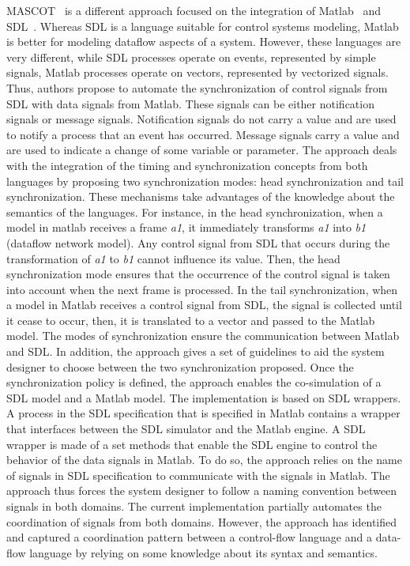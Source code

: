 MASCOT~\cite{mascotbib} is a different approach focused on the integration of Matlab~\cite{matlabbib} and SDL~\cite{sdlbib}. Whereas SDL is a language suitable for control systems modeling, Matlab is better for modeling dataflow aspects of a system. However, these languages are very different, while SDL processes operate on events, represented by simple signals, Matlab processes operate on vectors, represented by vectorized signals. Thus, authors propose to automate the synchronization of control signals from SDL with data signals from Matlab. These signals can be either notification signals or message signals. Notification signals do not carry a value and are used to notify a process that an event has occurred. Message signals carry a value and are used to indicate a change of some variable or parameter. The approach deals with the integration of the timing and synchronization concepts from both languages by proposing two synchronization modes: head synchronization and tail synchronization. These mechanisms take advantages of the knowledge about the semantics of the languages. For instance, in the head synchronization, when a model in matlab receives a frame \emph{a1}, it immediately transforms \emph{a1} into \emph{b1} (dataflow network model). Any control signal from SDL that occurs during the transformation of \emph{a1} to \emph{b1} cannot influence its value. Then, the head synchronization mode ensures that the occurrence of the control signal is taken into account when the next frame is processed. In the tail synchronization, when a model in Matlab receives a control signal from SDL, the signal is collected until it cease to occur, then, it is translated to a vector and passed to the Matlab model. The modes of synchronization ensure the communication between Matlab and SDL. In addition, the approach gives a set of guidelines to aid the system designer to choose between the two synchronization proposed. Once the synchronization policy is defined, the approach enables the co-simulation of a SDL model and a Matlab model. The implementation is based on SDL wrappers. A process in the SDL specification that is specified in Matlab contains a wrapper that interfaces between the SDL simulator and the Matlab engine. A SDL wrapper is made of a set methods that enable the SDL engine to control the behavior of the data signals in Matlab. To do so, the approach relies on the name of signals in SDL specification to communicate with the signals in Matlab. The approach thus forces the system designer to follow a naming convention between signals in both domains. The current implementation partially automates the coordination of signals from both domains. However, the approach has identified and captured a coordination pattern between a control-flow language and a data-flow language by relying on some knowledge about its syntax and semantics.
         	
